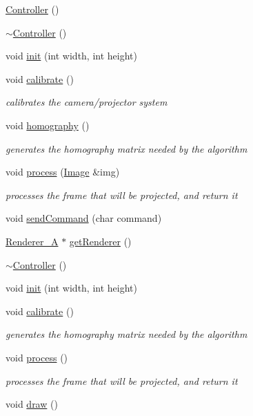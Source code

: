 \begin{DoxyCompactItemize}
\item 
\hyperlink{class_controller_a95c56822d667e94b031451729ce069a9}{Controller} ()
\item 
\hyperlink{class_controller_a0ab87934c4f7a266cfdb86e0f36bc1b5}{$\sim$\-Controller} ()
\item 
void \hyperlink{class_controller_a53e2dfd2b170b86a607fb23f69c13859}{init} (int width, int height)
\item 
void \hyperlink{class_controller_a3281d6167b17007535c5414c5c409b4b}{calibrate} ()
\begin{DoxyCompactList}\small\item\em calibrates the camera/projector system \end{DoxyCompactList}\item 
void \hyperlink{class_controller_ab05765b131b9cdf49b0665cb4bc91140}{homography} ()
\begin{DoxyCompactList}\small\item\em generates the homography matrix needed by the algorithm \end{DoxyCompactList}\item 
void \hyperlink{class_controller_aa9a8284feff5b720249e3fc6ad9b1592}{process} (\hyperlink{class_image}{Image} \&img)
\begin{DoxyCompactList}\small\item\em processes the frame that will be projected, and return it \end{DoxyCompactList}\item 
void \hyperlink{class_controller_a962e99675e6d27c2da77734a550340f4}{send\-Command} (char command)
\item 
\hyperlink{class_renderer___a}{Renderer\-\_\-\-A} $\ast$ \hyperlink{class_controller_a0220f7841ce40fd47e693b3e89e8cd52}{get\-Renderer} ()
\item 
\hyperlink{class_controller_a0ab87934c4f7a266cfdb86e0f36bc1b5}{$\sim$\-Controller} ()
\item 
void \hyperlink{class_controller_a53e2dfd2b170b86a607fb23f69c13859}{init} (int width, int height)
\item 
void \hyperlink{class_controller_a3281d6167b17007535c5414c5c409b4b}{calibrate} ()
\begin{DoxyCompactList}\small\item\em generates the homography matrix needed by the algorithm \end{DoxyCompactList}\item 
void \hyperlink{class_controller_a7ac58195c3342b7de52b762c0d759a3c}{process} ()
\begin{DoxyCompactList}\small\item\em processes the frame that will be projected, and return it \end{DoxyCompactList}\item 
void \hyperlink{class_controller_a02fdbce18ccb7becaa2aa9fd8fc4aa2b}{draw} ()
\end{DoxyCompactItemize}


